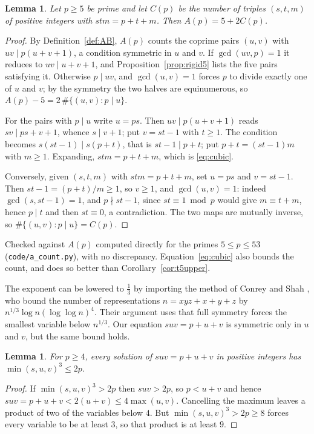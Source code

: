 \documentclass[11pt]{article}
\theoremstyle{plain}
\newtheorem{lemma}[theorem]{Lemma}
\theoremstyle{definition}
\begin{document}
\begin{lemma}\label{lem:acount}
Let $p\ge5$ be prime and let $C(p)$ be the number of triples $(s,t,m)$ of positive integers
with $stm=p+t+m$. Then $A(p)=5+2C(p)$.
\end{lemma}

\begin{proof}
By Definition~\ref{def:AB}, $A(p)$ counts the coprime pairs $(u,v)$ with $uv\mid p(u+v+1)$, a
condition symmetric in $u$ and $v$. If $\gcd(uv,p)=1$ it reduces to
$uv\mid u+v+1$, and Proposition~\ref{prop:rigid5} lists the five pairs satisfying it.
Otherwise $p\mid uv$, and $\gcd(u,v)=1$ forces $p$ to divide exactly one of $u$ and $v$; by
the symmetry the two halves are equinumerous, so $A(p)-5=2\,\#\{(u,v): p\mid u\}$.

For the pairs with $p\mid u$ write $u=ps$. Then $uv\mid p(u+v+1)$ reads
$sv\mid ps+v+1$, whence $s\mid v+1$; put $v=st-1$ with $t\ge1$. The condition becomes
$s(st-1)\mid s(p+t)$, that is $st-1\mid p+t$; put $p+t=(st-1)m$ with $m\ge1$. Expanding,
$stm=p+t+m$, which is \eqref{eq:cubic}.

Conversely, given $(s,t,m)$ with $stm=p+t+m$, set $u=ps$ and $v=st-1$. Then
$st-1=(p+t)/m\ge1$, so $v\ge1$, and $\gcd(u,v)=1$: indeed $\gcd(s,st-1)=1$, and $p\nmid
st-1$, since $st\equiv1 \bmod p$ would give $m\equiv t+m$, hence $p\mid t$ and then
$st\equiv0$, a contradiction. The two maps are mutually inverse, so
$\#\{(u,v):p\mid u\}=C(p)$.
\end{proof}

Checked against $A(p)$ computed directly for the primes $5\le p\le53$
(\texttt{code/a\_count.py}), with no discrepancy. Equation~\eqref{eq:cubic} also bounds the
count, and does so better than Corollary~\ref{cor:t5upper}.

The exponent can be lowered to $\tfrac13$ by importing the method of Conrey and Shah
\cite{ConreyShah}, who bound the number of representations $n=xyz+x+y+z$ by
$n^{1/3}\log n(\log\log n)^4$. Their argument uses that full symmetry forces the smallest
variable below $n^{1/3}$. Our equation $suv=p+u+v$ is symmetric only in $u$ and $v$, but
the same bound holds.

\begin{lemma}\label{lem:cuberoot}
For $p\ge4$, every solution of $suv=p+u+v$ in positive integers has
$\min(s,u,v)^3\le2p$.
\end{lemma}

\begin{proof}
If $\min(s,u,v)^3>2p$ then $suv>2p$, so $p<u+v$ and hence $suv=p+u+v<2(u+v)\le4\max(u,v)$.
Cancelling the maximum leaves a product of two of the variables below $4$. But
$\min(s,u,v)^3>2p\ge8$ forces every variable to be at least $3$, so that product is at
least $9$.
\end{proof}
\end{document}
